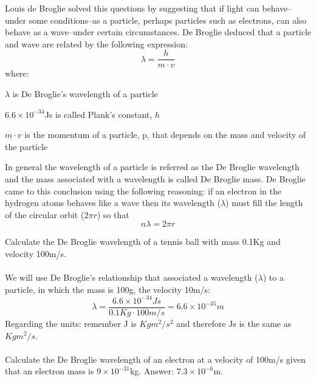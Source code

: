 \documentclass[main.tex]{subfiles}
\begin{document}
\begin{description}
\begin{minipage}[b]{1.5\linewidth}
\begin{tikzpicture}
\end{tikzpicture}
 \end{minipage}
Louis de Broglie solved this questions by suggesting that if light can behave--under some conditions--as a particle, perhaps particles such as electrons, can also behave as a wave--under certain circumstances. De Broglie deduced that a particle and wave are related by the following expression:
 \begin{equation*}
\lambda=\frac{h}{ m\cdot v}
\end{equation*}
where:
\begin{where}
 \item $\lambda$   is De Broglie's wavelength of a particle
  \item $6.6\times 10^{-34}$Js is called Plank's constant, $h$
 \item $m\cdot v$  is the momentum of a particle, p, that depends on the mass and velocity of the particle
\end{where}
In general the wavelength of a particle is referred as the De Broglie wavelength and the mass associated with a wavelength is called De Broglie mass. De Broglie came to this conclusion using the following reasoning: if an electron in the hydrogen atoms behaves like a wave then its wavelength ($\lambda$) must fill the length of the circular orbit ($2\pi r$) so that
 \begin{equation*}
n\lambda=2\pi r
\end{equation*}

\begin{example} %
Calculate the De Broglie wavelength of a tennis ball with mass 0.1Kg and velocity 100m/s.\\
\\
We will use De Broglie's relationship that associated a wavelength ($\lambda$) to a particle, in which the mass is 100g, the velocity 10m/s: 
\[\lambda=\frac{6.6\times 10^{-34}Js}{ 0.1Kg\cdot 100m/s}=6.6\times 10^{-35}m
\]
Regarding the units: remember J is $Kgm^2/s^2$ and therefore Js is the same as $Kgm^2/s$.\\
\faDiamond\ \\
Calculate the De Broglie wavelength of an electron at a velocity of 100m/s given that an electron mass is $9\times 10^{-31}$kg.
\flushright Answer: $7.3\times 10^{-6}$m. 
\end{example}%


\end{description}
\end{document}
